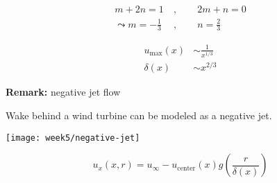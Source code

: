 \begin{align}
m+2n=1\ &,\qquad 2m+n=0 \\
\leadsto
m=-\frac{1}{3}\ &,\qquad n=\frac{2}{3}
\end{align}

\begin{align}
u_\mathrm{max}(x)&\sim\frac{1}{x^{1/3}}\\
\delta(x)&\sim x^{2/3}
\end{align}

\begin{framed}
\textbf{Remark:} negative jet flow

Wake behind a wind turbine can be modeled as a negative jet.

{\center
\texttt{[image: week5/negative-jet]}\\
}

\begin{equation}
u_x(x,r) = u_\infty-u_\mathrm{center}(x)g\left(\frac{r}{\delta(x)}\right)
\end{equation}
\end{framed}